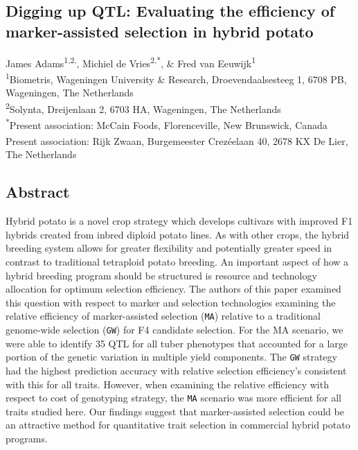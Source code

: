 \begin{refsection}
\chapter[Digging up QTL: Evaluating the efficiency of marker-assisted selection in hybrid potato]{Digging up QTL: Evaluating the efficiency of marker-assisted selection in hybrid potato}
\label{cha:chapter4}

\begin{center}
James Adams\textsuperscript{1,2,\textdagger},
Michiel de Vries\textsuperscript{2,*}, \&
Fred van Eeuwijk\textsuperscript{1}\\[0.5em]
\small
\textsuperscript{1}Biometris, Wageningen University \& Research, Droevendaalsesteeg 1, 6708 PB, Wageningen, The Netherlands\\
\textsuperscript{2}Solynta, Dreijenlaan 2, 6703 HA, Wageningen, The Netherlands\\
\textsuperscript{*}Present association: McCain Foods, Florenceville, New Brunswick, Canada\\
\textsuperscript{\textdagger } Present association: Rijk Zwaan, Burgemeester Crezéelaan 40, 2678 KX De Lier, The Netherlands\\
\end{center}
\vspace{0.5em}

\vspace*{\fill}

\newpage

\section*{Abstract}

Hybrid potato is a novel crop strategy which develops cultivars with improved F1 
hybrids created from inbred diploid potato lines. As with other crops,
the hybrid breeding system allows for greater flexibility and
potentially greater speed in contrast to traditional tetraploid potato
breeding. An important aspect of how a hybrid breeding program should be
structured is resource and technology allocation for optimum selection efficiency.
The authors of this paper examined this question with respect to marker
and selection technologies examining the relative efficiency of
marker-assisted selection (\texttt{MA}) relative to a traditional
genome-wide selection (\texttt{GW}) for F4 candidate selection. For the MA scenario, we were
able to identify 35 QTL for all tuber phenotypes that accounted for a large portion of the genetic variation in multiple yield components. The \texttt{GW} strategy
had the highest prediction accuracy with relative selection efficiency's
consistent with this for all traits. However, when examining the
relative efficiency with respect to cost of genotyping strategy, the
\texttt{MA} scenario was more efficient for all traits studied here. Our
findings suggest that marker-assisted selection could be an attractive
method for quantitative trait selection in commercial hybrid potato
programs.


\end{refsection}

